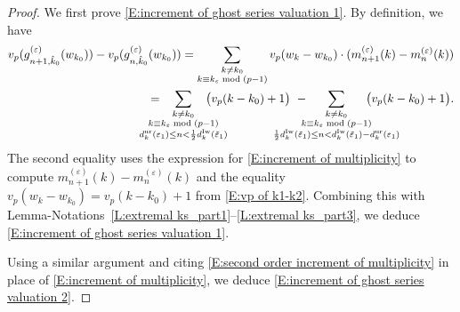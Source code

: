 \documentclass[12pt]{amsart}
\theoremstyle{definition}
\numberwithin{equation}{subsection}
\def\k{\mathbf{k}}
\newcommand{\Iw}{\mathrm{Iw}}
\newcommand{\unr}{\mathrm{ur}}
\begin{document}
\begin{proof}
We first prove \eqref{E:increment of ghost series valuation 1}.
By definition, we have
\begin{align*}
v_p(g_{n+1, \hat k_0}^{(\varepsilon)}(w_{k_0})) - v_p(g_{n, \hat k_0}^{(\varepsilon)}(w_{k_0})) = 
\sum_{\substack{k \neq k_0\\k \equiv k_\varepsilon \bmod{(p-1)}}} v_p(w_k-w_{k_0}) \cdot (m_{n+1}^{(\varepsilon)}(k) - m_{n}^{(\varepsilon)}(k))
\\=  \hspace{-20pt}
\sum_{\substack{
k \neq k_0
\\k \equiv k_\varepsilon \bmod{(p-1)}
\\
d_{k}^\unr(\varepsilon_1) \leq n < \frac 12 d_{k}^\Iw(\tilde \varepsilon_1)}}
\hspace{-20pt}\big( v_p(k-k_0)+1 \big)\ -  \hspace{-30pt} \sum_{\substack{
k \neq k_0
\\k \equiv k_\varepsilon \bmod{(p-1)}
\\
\frac 12 d_{k}^\Iw(\tilde \varepsilon_1)  \leq n < d_{k}^{\Iw}(\tilde \varepsilon_1) - d_{k}^\unr(\varepsilon_1)  }}
\hspace{-30pt}\big( v_p(k-k_0)+1 \big).
\end{align*}
The second equality uses the expression for \eqref{E:increment of multiplicity} to compute $m_{n+1}^{(\varepsilon)}(k) - m_{n}^{(\varepsilon)}(k)$ and the equality $v_p(w_k-w_{k_0}) =v_p(k-k_0)+1$ from \eqref{E:vp of k1-k2}.
Combining this with Lemma-Notations~\ref{L:extremal ks_part1}--\ref{L:extremal ks_part3}, we deduce \eqref{E:increment of ghost series valuation 1}.

Using a similar argument and citing \eqref{E:second order increment of multiplicity} in place of \eqref{E:increment of multiplicity}, we deduce \eqref{E:increment of ghost series valuation 2}.
\end{proof}
\end{document}
